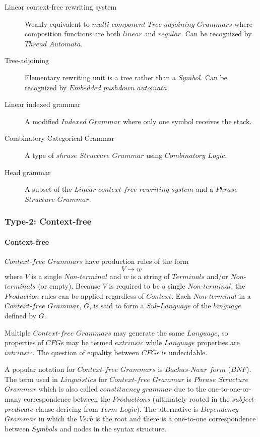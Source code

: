 \documentclass{article}
\begin{document}
    \begin{description}
    \item[Linear context-free rewriting system]
    Weakly equivalent to $multi$-$component$ $Tree$-$adjoining$ $Grammars$
    where composition functions are both $linear$ and $regular$. Can
    be recognized by $Thread$ $Automata$.
    \item[Tree-adjoining]
    Elementary rewriting unit is a tree rather than a $Symbol$. Can be
    recognized by $Embedded$ $pushdown$ $automata$.
    \item[Linear indexed grammar]
    A modified $Indexed$ $Grammar$ where only one symbol receives the stack.
    \item[Combinatory Categorical Grammar]
    A type of $shrase$ $Structure$ $Grammar$ using $Combinatory$ $Logic$.
    \item[Head grammar]
    A subset of the $Linear$ $context$-$free$ $rewriting$ $system$ and a
    $Phrase$ $Structure$ $Grammar$.
    \end{description}

\subsubsection{Type-2: Context-free}

    \paragraph{Context-free}
    $Context$-$free$ $Grammars$ have production rules of the form
    \[
        V \rightarrow w
    \]
    where $V$ is a single $Non$-$terminal$ and $w$ is a string of
    $Terminals$ and/or $Non$-$terminals$ (or empty). Because $V$ is
    required to be a single $Non$-$terminal$, the $Production$ rules
    can be applied regardless of $Context$. Each $Non$-$terminal$ in a
    $Context$-$free$ $Grammar$, $G$, is said to form a
    $Sub$-$Language$ of the $language$ defined by $G$.

    Multiple $Context$-$free$ $Grammars$ may generate the same
    $Language$, so properties of $CFG$s may be termed $extrinsic$
    while $Language$ properties are $intrinsic$. The question of
    equality between $CFG$s is undecidable.

    A popular notation for $Context$-$free$ $Grammars$ is
    $Backus$-$Naur$ $form$ ($BNF$). The term used in $Linguistics$ for
    $Context$-$free$ $Grammar$ is $Phrase$ $Structure$ $Grammar$ which
    is also called $constituency$ $grammar$ due to the
    one-to-one-or-many correspondence between the $Productions$
    (ultimately rooted in the $subject$-$predicate$ clause deriving
    from $Term$ $Logic$). The alternative is $Dependency$ $Grammar$ in
    which the $Verb$ is the root and there is a one-to-one
    correspondence between $Symbols$ and nodes in the syntax
    structure.
\end{document}
